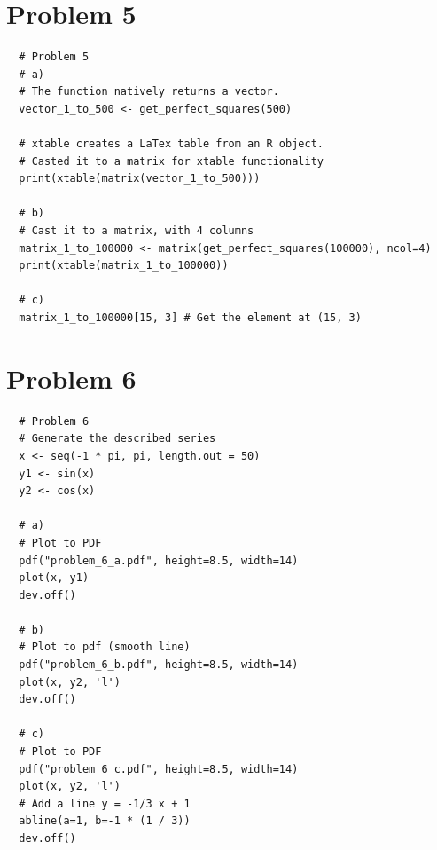 \documentclass{amsart}
\begin{document}
\section*{Problem 5}
\begin{verbatim}
  # Problem 5
  # a)
  # The function natively returns a vector.
  vector_1_to_500 <- get_perfect_squares(500)

  # xtable creates a LaTex table from an R object.
  # Casted it to a matrix for xtable functionality
  print(xtable(matrix(vector_1_to_500)))

  # b)
  # Cast it to a matrix, with 4 columns
  matrix_1_to_100000 <- matrix(get_perfect_squares(100000), ncol=4)
  print(xtable(matrix_1_to_100000))

  # c)
  matrix_1_to_100000[15, 3] # Get the element at (15, 3)
\end{verbatim}
\section*{Problem 6}
\begin{verbatim}
  # Problem 6
  # Generate the described series
  x <- seq(-1 * pi, pi, length.out = 50)
  y1 <- sin(x)
  y2 <- cos(x)

  # a)
  # Plot to PDF
  pdf("problem_6_a.pdf", height=8.5, width=14)
  plot(x, y1)
  dev.off()

  # b)
  # Plot to pdf (smooth line)
  pdf("problem_6_b.pdf", height=8.5, width=14)
  plot(x, y2, 'l')
  dev.off()

  # c)
  # Plot to PDF
  pdf("problem_6_c.pdf", height=8.5, width=14)
  plot(x, y2, 'l')
  # Add a line y = -1/3 x + 1
  abline(a=1, b=-1 * (1 / 3))
  dev.off()
\end{verbatim}
\end{document}
